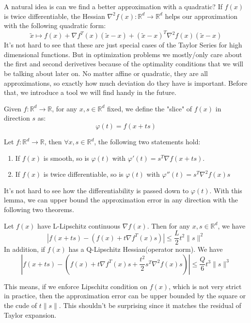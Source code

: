 A natural idea is can we find a better approximation with a quadratic? If $f(x)$ is twice differentiable, the Hessian $\nabla^2f(x): \mathbb{R}^d \rightarrow \mathbb{R}^d$ helps our approximation with the following quadratic form:
\begin{equation*}
    \tilde{x} \mapsto f(x) + \nabla f^T(x)(\tilde{x}-x) + (\tilde{x}-x)^T\nabla^2 f(x)(\tilde{x}-x)
\end{equation*}
It's not hard to see that these are just special cases of the Taylor Series for high dimensional functions. But in optimization problems we mostly/only care about the first and second derivetives because of the optimality conditions that we will be talking about later on. No matter affine or quadratic, they are all approximations, so exactly how much deviation do they have is important. Before that, we introduce a tool we will find handy in the future.

\begin{definition}
    Given $f:\mathbb{R}^d \rightarrow \mathbb{R}$, for any $x, s \in \mathbb{R}^d$ fixed, we define the "slice" of $f(x)$ in direction $s$ as:
    \begin{equation*}
        \varphi(t) = f(x + ts)
    \end{equation*}
\end{definition}

\begin{lemma}
    Let $f:\mathbb{R}^d \rightarrow \mathbb{R}$, then $\forall x,s \in \mathbb{R}^d$, the following two statements hold:
    \begin{enumerate}
        \item If $f(x)$ is smooth, so is $\varphi(t)$ with $\varphi'(t) = s^T \nabla f(x+ts)$.
        \item If $f(x)$ is twice differentiable, so is $\varphi(t)$ with $\varphi''(t) = s^T \nabla^2 f(x) s$
    \end{enumerate}
\end{lemma}

It's not hard to see how the differentiability is passed down to $\varphi(t)$. With this lemma, we can upper bound the approximation error in any direction with the following two theorems.

\begin{theorem}
    Let $f(x)$ have L-Lipschitz continuous $\nabla f(x)$. Then for any $x, s \in \mathbb{R}^d$, we have
    \begin{equation}
        | f(x+ts) - (f(x) + t\nabla f^T(x)s) | \leq \frac{L}{2}t^2\|s\|^2
    \end{equation}
    In addition, if $f(x)$ has a Q-Lipschitz Hessian(operator norm). We have
    \begin{equation}
        |f(x + ts) - (f(x) + t \nabla f^T(x)s + \frac{t^2}{2}s^T \nabla^2 f(x)s)| \leq \frac{Q}{6}t^3\|s\|^3
    \end{equation}
\end{theorem}
This means, if we enforce Lipschitz condition on $f(x)$, which is not very strict in practice, then the approximation error can be upper bounded by the square or the cude of $t\|s\|$. This shouldn't be surprising since it matches the residual of Taylor expansion. 


